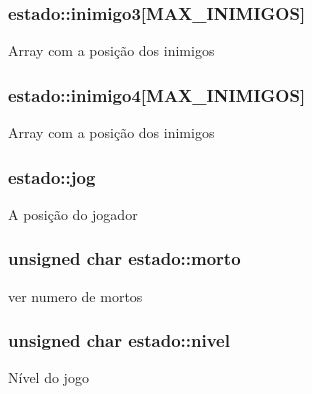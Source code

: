 \subsubsection[{\texorpdfstring{inimigo3}{inimigo3}}]{ estado\+::inimigo3\mbox{[}M\+A\+X\+\_\+\+I\+N\+I\+M\+I\+G\+OS\mbox{]}}\hypertarget{structestado_affd195b1ac844359ae7c68fdce7efe5e}{}\label{structestado_affd195b1ac844359ae7c68fdce7efe5e}
Array com a posição dos inimigos 
\subsubsection[{\texorpdfstring{inimigo4}{inimigo4}}]{ estado\+::inimigo4\mbox{[}M\+A\+X\+\_\+\+I\+N\+I\+M\+I\+G\+OS\mbox{]}}\hypertarget{structestado_ad2ab0aed08f6293af662f4978f7a27b5}{}\label{structestado_ad2ab0aed08f6293af662f4978f7a27b5}
Array com a posição dos inimigos 
\subsubsection[{\texorpdfstring{jog}{jog}}]{ estado\+::jog}\hypertarget{structestado_abf55d0d40aafdd6829efbc8265b4f724}{}\label{structestado_abf55d0d40aafdd6829efbc8265b4f724}
A posição do jogador 
\subsubsection[{\texorpdfstring{morto}{morto}}]{\setlength{\rightskip}{0pt plus 5cm}unsigned char estado\+::morto}\hypertarget{structestado_a2f9104ddb43ef1af18ea05e37e358e63}{}\label{structestado_a2f9104ddb43ef1af18ea05e37e358e63}
ver numero de mortos 
\subsubsection[{\texorpdfstring{nivel}{nivel}}]{\setlength{\rightskip}{0pt plus 5cm}unsigned char estado\+::nivel}\hypertarget{structestado_a6c596fad6caafe5949cf1a06be7684b9}{}\label{structestado_a6c596fad6caafe5949cf1a06be7684b9}
Nível do jogo 

